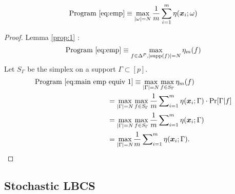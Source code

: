     \begin{frame}
    
    \begin{proposition}
    \vspace{-.3cm}
    \begin{equation}
    \text{Program \ref{eq:emp}} \equiv  \max_{|\omega|=N}  \frac{1}{m}\sum_{i=1}^m \eta({\bm{x}}_{i}; \omega) \label{eq:greedy}
    \end{equation} \label{prop:2}
    \vspace{-.3cm}
    \end{proposition}
    \begin{proof}
    Lemma \ref{prop:1} : 
    \begin{equation}
    \text{Program \ref{eq:emp}} \equiv 
    \max_{f\in \Delta^P, |\text{supp}(f)| = N}\eta_m(f)\label{eq:main emp equiv 1}
    \end{equation} 
    Let $S_\Gamma$ be the simplex on a support $\Gamma\subset [p]$. 
    \begin{align}
    \text{Program \ref{eq:main emp equiv 1}} &  \equiv
    \max_{|\Gamma|=N} \max_{f\in S_\Gamma}\eta_m(f) \nonumber\\
     = \max_{|\Gamma|=N} &\max_{f \in S_\Gamma} \frac{1}{m}\sum\nolimits_{i=1}^m\eta({\bm{x}}_{i};\Gamma) \cdot \Pr[\Gamma|f] \nonumber\\
     = \max_{|\Gamma|=N}& \max_{f \in S_\Gamma} \frac{1}{m}\sum\nolimits_{i=1}^m\eta({\bm{x}}_{i};\Gamma) \nonumber\\
     =  \max_{|\Gamma|=N} & \frac{1}{m}\sum\nolimits_{i=1}^m\eta({\bm{x}}_{i};\Gamma).
    \label{eq:main emp equiv 2}
    \end{align}\end{proof}
    \end{frame}

\subsection{Stochastic LBCS}

